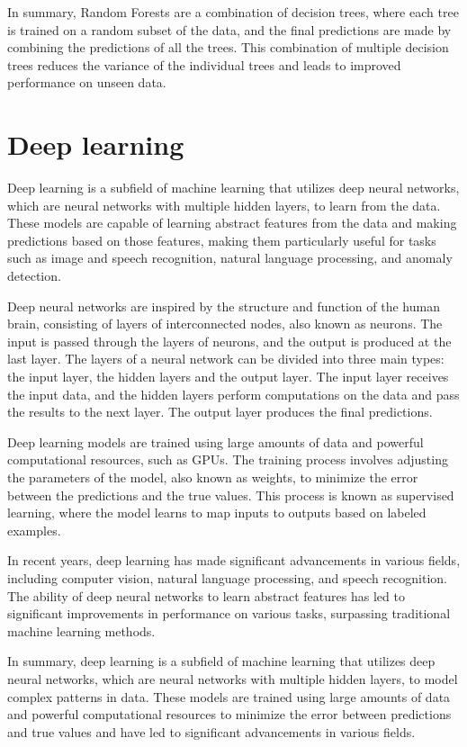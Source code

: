 In summary, Random Forests are a combination of decision trees, where each tree is trained on a random subset of the data, and the final predictions are made by combining the predictions of all the trees.
This combination of multiple decision trees reduces the variance of the individual trees and leads to improved performance on unseen data.



\section{Deep learning}
Deep learning \cite{goodfellow2016deep} is a subfield of machine learning that utilizes deep neural networks, which are neural networks with multiple hidden layers, to learn from the data.
These models are capable of learning abstract features from the data and making predictions based on those features, making them particularly useful for tasks such as image and speech recognition, natural language processing, and anomaly detection.

Deep neural networks are inspired by the structure and function of the human brain, consisting of layers of interconnected nodes, also known as neurons.
The input is passed through the layers of neurons, and the output is produced at the last layer.
The layers of a neural network can be divided into three main types: the input layer, the hidden layers and the output layer.
The input layer receives the input data, and the hidden layers perform computations on the data and pass the results to the next layer. 
The output layer produces the final predictions.

Deep learning models are trained using large amounts of data and powerful computational resources, such as GPUs.
The training process involves adjusting the parameters of the model, also known as weights, to minimize the error between the predictions and the true values.
This process is known as supervised learning, where the model learns to map inputs to outputs based on labeled examples.

In recent years, deep learning has made significant advancements in various fields, including computer vision, natural language processing, and speech recognition.
The ability of deep neural networks to learn abstract features has led to significant improvements in performance on various tasks, surpassing traditional machine learning methods.

In summary, deep learning is a subfield of machine learning that utilizes deep neural networks, which are neural networks with multiple hidden layers, to model complex patterns in data.
These models are trained using large amounts of data and powerful computational resources to minimize the error between predictions and true values and have led to significant advancements in various fields.


